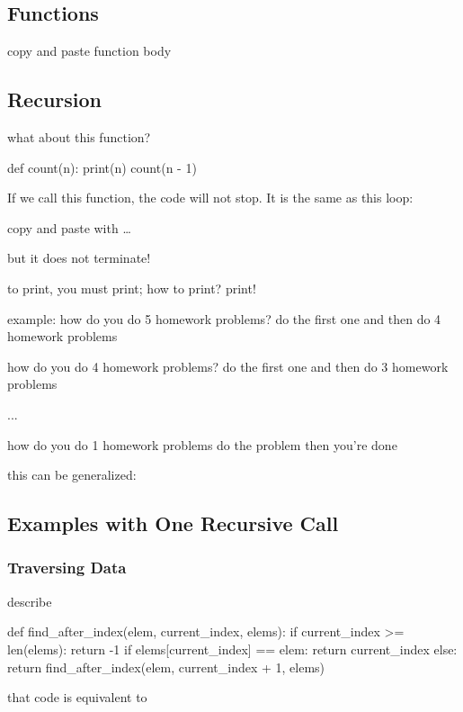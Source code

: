 \documentclass[11pt]{cselabheader}
\begin{document}
\subsection{Functions}
copy and paste function body

\subsection{Recursion}

what about this function?

\begin{python3code}
def count(n):
    print(n)
    count(n - 1)
\end{python3code}

If we call this function, the code will not stop.
It is the same as this loop:

copy and paste with \dots

but it does not terminate!

to print, you must print; how to print? print!

example:
how do you do 5 homework problems?
do the first one and then do 4 homework problems

how do you do 4 homework problems?
do the first one and then do 3 homework problems

...

how do you do 1 homework problems
do the problem then you're done

this can be generalized:

\subsection{Examples with One Recursive Call}
\subsubsection{Traversing Data}
describe
\begin{python3code}
def find_after_index(elem, current_index, elems):
    if current_index >= len(elems):
        return -1
    if elems[current_index] == elem:
        return current_index
    else:
        return find_after_index(elem, current_index + 1, elems)
\end{python3code}

that code is equivalent to

\begin{python3code}
\end{python3code}
\end{document}
